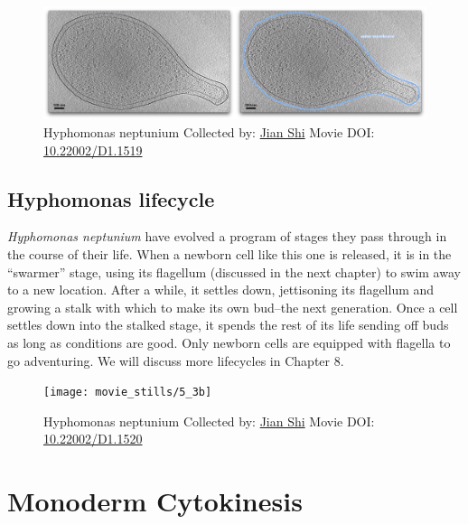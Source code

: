 \documentclass[]{tufte-book}
\begin{document}
\begin{figure}
\includegraphics{movie_stills/5_3a} \caption[Hyphomonas neptunium Collected by:
\protect\hyperlink{jian_shi}{Jian Shi} Movie DOI:
\href{https://doi.org/10.22002/D1.1519}{10.22002/D1.1519}]{Hyphomonas neptunium Collected by:
\protect\hyperlink{jian_shi}{Jian Shi} Movie DOI:
\href{https://doi.org/10.22002/D1.1519}{10.22002/D1.1519}}\label{fig:5-3a}
\end{figure}

\hypertarget{Hyphomonas_lifecycle}{\subsection{Hyphomonas
lifecycle}\label{Hyphomonas_lifecycle}}

\emph{Hyphomonas neptunium} have evolved a program of stages they pass
through in the course of their life. When a newborn cell like this one
is released, it is in the ``swarmer'' stage, using its flagellum
(discussed in the next chapter) to swim away to a new location. After a
while, it settles down, jettisoning its flagellum and growing a stalk
with which to make its own bud--the next generation. Once a cell settles
down into the stalked stage, it spends the rest of its life sending off
buds as long as conditions are good. Only newborn cells are equipped
with flagella to go adventuring. We will discuss more lifecycles in
Chapter 8.





\begin{figure}
\texttt{[image: movie\_stills/5\_3b]} \caption[Hyphomonas neptunium Collected by:
\protect\hyperlink{jian_shi}{Jian Shi} Movie DOI:
\href{https://doi.org/10.22002/D1.1520}{10.22002/D1.1520}]{Hyphomonas neptunium Collected by:
\protect\hyperlink{jian_shi}{Jian Shi} Movie DOI:
\href{https://doi.org/10.22002/D1.1520}{10.22002/D1.1520}}\label{fig:5-3b}
\end{figure}

\section{Monoderm Cytokinesis}\label{monoderm-cytokinesis}
\end{document}

